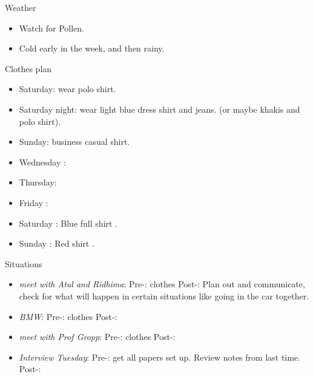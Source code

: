\documentclass[serif, mathserif, final]{beamer}
\begin{document}
\begin{frame}{}
\begin{columns}
\begin{column}{0.20\linewidth}
\begin{block}{Weather} 
  \begin{itemize}
  \tiny \item \tiny Watch for Pollen.
  \item \tiny Cold early in the week, and then rainy. 
  \end{itemize}
\end{block} 

  \begin{block}{Clothes plan} 
    \begin{itemize} 
      \tiny \item \tiny Saturday: wear polo shirt. 
    \item \tiny Saturday night: wear light blue dress shirt and jeans. (or maybe khakis and polo shirt). 
    \item \tiny Sunday: business casual shirt. 
    \item \tiny Wednesday : 
    \item \tiny Thursday: 
    \item \tiny Friday : 
    \item \tiny Saturday : Blue full shirt . 
    \item \tiny Sunday : Red shirt .
    \end{itemize} 
  \end{block}

  \begin{block}{Situations} 
    \begin{itemize} 
      \tiny \item \tiny \textit{meet with Atul and Ridhima}: Pre-: clothes
      Post-: Plan out and communicate, check for what will happen in
      certain situations like going in the car together.  
      \item \tiny \textit{BMW}: Pre-: clothes   Post-:  
    \item \tiny \textit{meet with Prof Gropp}: Pre-: clothes   Post-:  
      \item \tiny \textit{Interview Tuesday}: Pre-: get all papers set
        up.  Review notes from last time. Post-:  
    \end{itemize}
  \end{block}
\end{column}%
\end{columns}

\end{frame}
\end{document}
